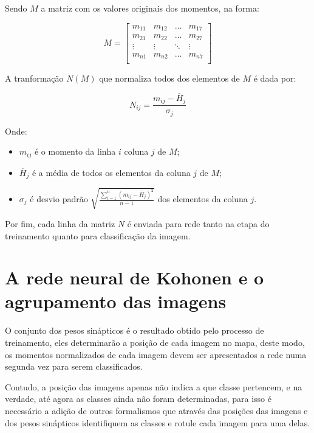 Sendo $ M $ a matriz com os valores originais dos momentos, na forma:

\begin{equation}\label{eq:momentos_matriz}
  M = \left[
    \begin{array}{cccc}
        m_{11} & m_{12} & \hdots & m_{17} \\
        m_{21} & m_{22} & \hdots & m_{27} \\
        \vdots & \vdots & \ddots & \vdots \\
        m_{n1} & m_{n2} & \hdots & m_{n7} \\
    \end{array}
  \right]
\end{equation}

A tranformação $ N(M) $ que normaliza todos dos elementos de $ M $ é dada por:

\begin{equation}\label{eq:momentos_transformacao}
  N_{ij} = \frac{m_{ij} - \overline{H}_j}{\sigma_j}
\end{equation}

Onde:

\begin{itemize}
\item $ m_{ij} $ é o momento da linha $ i $ coluna $ j $ de $ M $;
\item $ \overline{H}_j $ é a média de todos os elementos da coluna $ j $ de $ M $;
\item $ \sigma_j $ é desvio padrão $ \sqrt{\frac{\sum_{i=1}^n (m_{ij} - \overline{H}_j)^2}{n - 1}} $
      dos elementos da coluna $ j $.
\end{itemize}

Por fim, cada linha da matriz $ N $ é enviada para rede tanto na etapa do treinamento
quanto para classificação da imagem.

\section{A rede neural de Kohonen e o agrupamento das imagens}\label{sec:rede_kohonen_imagens}

O conjunto dos pesos sinápticos é o resultado obtido pelo processo de
treinamento, eles determinarão a posição de cada imagem no mapa, deste modo, os
momentos normalizados de cada imagem devem ser apresentados a rede numa segunda
vez para serem classificados.

Contudo, a posição das imagens apenas não indica a que classe pertencem, e na
verdade, até agora as classes ainda não foram determinadas, para isso é
necessário a adição de outros formalismos que através das posições das imagens
e dos pesos sinápticos identifiquem as classes e rotule cada imagem para uma
delas.

